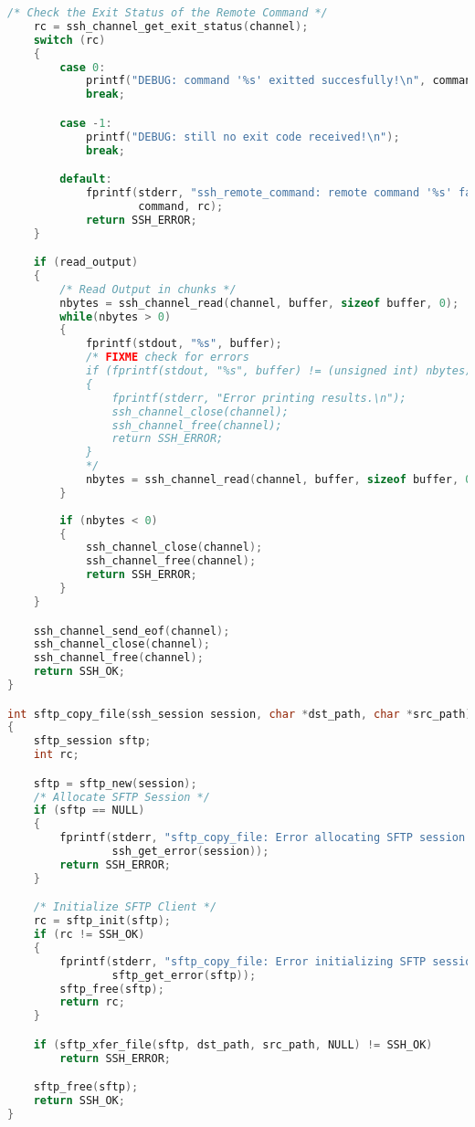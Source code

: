 \begin{lstlisting}[language=C,caption={Signature and schematic implementation of remote execution methods.\label{code:libssh}}]
    /* Check the Exit Status of the Remote Command */
    rc = ssh_channel_get_exit_status(channel);
    switch (rc) 
    {
        case 0:
            printf("DEBUG: command '%s' exitted succesfully!\n", command);
            break;

        case -1:
            printf("DEBUG: still no exit code received!\n");
            break;

        default:
            fprintf(stderr, "ssh_remote_command: remote command '%s' failed w/ exit status %i\n",
                    command, rc);
            return SSH_ERROR;
    }

    if (read_output)
    {
        /* Read Output in chunks */
        nbytes = ssh_channel_read(channel, buffer, sizeof buffer, 0);
        while(nbytes > 0)
        {
            fprintf(stdout, "%s", buffer);
            /* FIXME check for errors
            if (fprintf(stdout, "%s", buffer) != (unsigned int) nbytes)
            {
                fprintf(stderr, "Error printing results.\n");
                ssh_channel_close(channel);
                ssh_channel_free(channel);
                return SSH_ERROR;
            }
            */
            nbytes = ssh_channel_read(channel, buffer, sizeof buffer, 0);
        }
        
        if (nbytes < 0)
        {
            ssh_channel_close(channel);
            ssh_channel_free(channel);
            return SSH_ERROR;
        }
    }

    ssh_channel_send_eof(channel);
    ssh_channel_close(channel);
    ssh_channel_free(channel);
    return SSH_OK;
}

int sftp_copy_file(ssh_session session, char *dst_path, char *src_path)
{
    sftp_session sftp;
    int rc;

    sftp = sftp_new(session);
    /* Allocate SFTP Session */
    if (sftp == NULL)
    {
        fprintf(stderr, "sftp_copy_file: Error allocating SFTP session: %s\n",
                ssh_get_error(session));
        return SSH_ERROR;
    }

    /* Initialize SFTP Client */
    rc = sftp_init(sftp);
    if (rc != SSH_OK)
    {
        fprintf(stderr, "sftp_copy_file: Error initializing SFTP session: %d\n",
                sftp_get_error(sftp));
        sftp_free(sftp);
        return rc;
    }

    if (sftp_xfer_file(sftp, dst_path, src_path, NULL) != SSH_OK)
        return SSH_ERROR;

    sftp_free(sftp);
    return SSH_OK;
}


\end{lstlisting}
